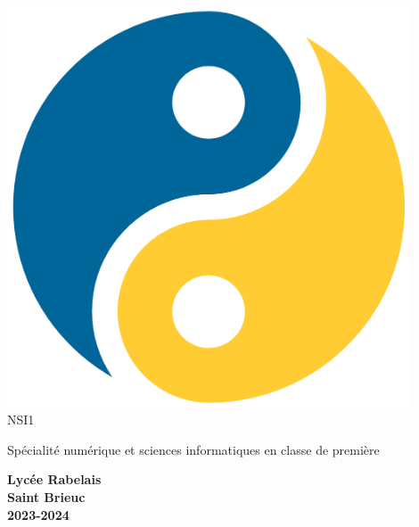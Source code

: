 \begin{titlepage}
    \begin{center}
        \includegraphics[width=12cm]{titlepage/img/yin_yang_python}\\[2em]

        {\bigtitlefont \LARGE\color{gray} NSI1}

        {\titlefont\Large\color{gray} Spécialité numérique et sciences informatiques en classe de première\\[2em]}

        {\color{gray}\textbf{Lycée Rabelais\\ Saint Brieuc\\ 2023-2024}}
    \end{center}
\end{titlepage}